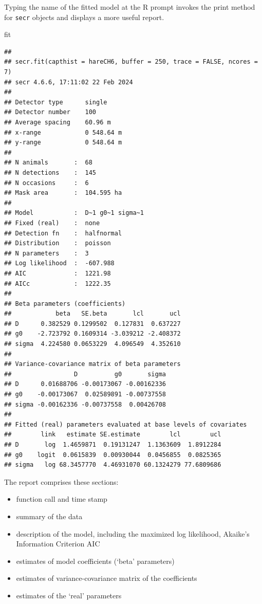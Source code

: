 \documentclass[
]{book}
\newenvironment{Shaded}{\begin{snugshade}}{\end{snugshade}}
\newcommand{\NormalTok}[1]{#1}
\providecommand{\tightlist}{%
  \setlength{\itemsep}{0pt}\setlength{\parskip}{0pt}}
\begin{document}
Typing the name of the fitted model at the R prompt invokes the print method for \texttt{secr} objects and displays a more useful report.

\begin{Shaded}
\begin{Highlighting}[]
\NormalTok{fit}
\end{Highlighting}
\end{Shaded}

\begin{verbatim}
## 
## secr.fit(capthist = hareCH6, buffer = 250, trace = FALSE, ncores = 7)
## secr 4.6.6, 17:11:02 22 Feb 2024
## 
## Detector type      single 
## Detector number    100 
## Average spacing    60.96 m 
## x-range            0 548.64 m 
## y-range            0 548.64 m 
## 
## N animals       :  68  
## N detections    :  145 
## N occasions     :  6 
## Mask area       :  104.595 ha 
## 
## Model           :  D~1 g0~1 sigma~1 
## Fixed (real)    :  none 
## Detection fn    :  halfnormal
## Distribution    :  poisson 
## N parameters    :  3 
## Log likelihood  :  -607.988 
## AIC             :  1221.98 
## AICc            :  1222.35 
## 
## Beta parameters (coefficients) 
##            beta   SE.beta       lcl       ucl
## D      0.382529 0.1299502  0.127831  0.637227
## g0    -2.723792 0.1609314 -3.039212 -2.408372
## sigma  4.224580 0.0653229  4.096549  4.352610
## 
## Variance-covariance matrix of beta parameters 
##                 D          g0       sigma
## D      0.01688706 -0.00173067 -0.00162336
## g0    -0.00173067  0.02589891 -0.00737558
## sigma -0.00162336 -0.00737558  0.00426708
## 
## Fitted (real) parameters evaluated at base levels of covariates 
##        link   estimate SE.estimate        lcl        ucl
## D       log  1.4659871  0.19131247  1.1363609  1.8912284
## g0    logit  0.0615839  0.00930044  0.0456855  0.0825365
## sigma   log 68.3457770  4.46931070 60.1324279 77.6809686
\end{verbatim}

\vspace{12pt}

The report comprises these sections:

\begin{itemize}
\tightlist
\item
  function call and time stamp
\item
  summary of the data
\item
  description of the model, including the maximized log likelihood, Akaike's Information Criterion AIC
\item
  estimates of model coefficients (`beta' parameters)
\item
  estimates of variance-covariance matrix of the coefficients
\item
  estimates of the `real' parameters
\end{itemize}
\end{document}
